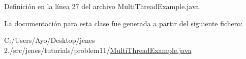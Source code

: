 Definición en la línea 27 del archivo Multi\-Thread\-Example.\-java.



La documentación para esta clase fue generada a partir del siguiente fichero\-:\begin{DoxyCompactItemize}
\item 
C\-:/\-Users/\-Ayo/\-Desktop/jenes 2./src/jenes/tutorials/problem11/\hyperlink{_multi_thread_example_8java}{Multi\-Thread\-Example.\-java}\end{DoxyCompactItemize}
